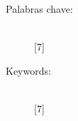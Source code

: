 \begin{multicols}{2}
\begin{description}
\item [Palabras chave:] \mbox{} \\[-20pt]
  [7] %
\end{description}
\begin{description}
\item [Keywords:] \mbox{} \\[-20pt]
  [7] %
\end{description}
\end{multicols}
